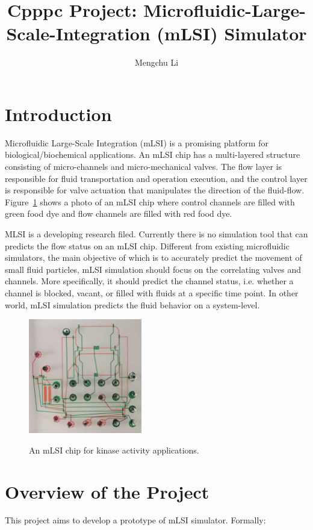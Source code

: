 \documentclass{article}
\title{Cpppc Project: Microfluidic-Large-Scale-Integration (mLSI) Simulator}
\author{Mengchu Li}
\begin{document}
\maketitle
\section{Introduction}

Microfluidic Large-Scale Integration (mLSI) is a promising platform for biological/biochemical applications. An mLSI chip has a multi-layered structure consisting of micro-channels and micro-mechanical valves. The flow layer is responsible for fluid transportation and operation execution, and the control layer is responsible for valve actuation that manipulates the direction of the fluid-flow.  
Figure~\ref{fig:mlsi} shows a photo of an mLSI chip where control channels are filled with green food dye and flow channels are filled with red food dye.

MLSI is a developing research filed. Currently there is no simulation tool that can predicts the flow status on an mLSI chip. Different from existing microfluidic simulators, the main objective of which is to accurately predict the movement of small fluid particles, mLSI simulation should focus on the correlating valves and channels. More specifically, it should predict the channel status, i.e. whether a channel is blocked, vacant, or filled with fluids at a specific time point. In other world, mLSI simulation predicts the fluid behavior on a system-level.

\begin{figure}
\caption{An mLSI chip for kinase activity applications.}
\includegraphics[height = 5cm]{mlsi}
\label{fig:mlsi}
\end{figure}

\section{Overview of the Project}
This project aims to develop a prototype of mLSI simulator. Formally:
\end{document}
